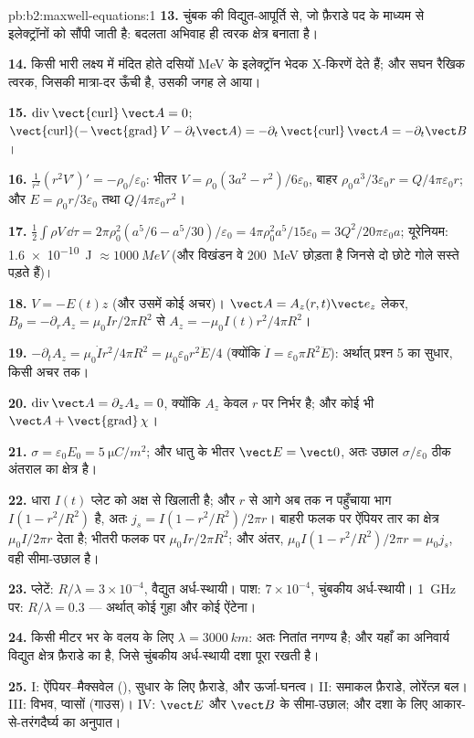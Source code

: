 \begin{solution}{pb:b2:maxwell-equations:1}
\textbf{13.} चुंबक की विद्युत-आपूर्ति से, जो फ़ैराडे पद के माध्यम से
इलेक्ट्रॉनों को सौंपी जाती है: बदलता अभिवाह ही त्वरक क्षेत्र बनाता है।

\textbf{14.} किसी भारी लक्ष्य में मंदित होते दसियों \unit{MeV} के इलेक्ट्रॉन
भेदक X-किरणें देते हैं; और सघन रैखिक त्वरक, जिसकी मात्रा-दर ऊँची है,
उसकी जगह ले आया।

\textbf{15.} $\operatorname{div}\operatorname{\vect{curl}}\vect A = 0$; $\operatorname{\vect{curl}}(-\operatorname{\vect{grad}}
V - \partial_t\vect A) = -\partial_t\operatorname{\vect{curl}}\vect A = -\partial_t\vect B$।

\textbf{16.} $\frac1{r^2}(r^2V')' = -\rho_0/\varepsilon_0$: भीतर $V = \rho_0(3a^2 - r^2)/6\varepsilon_0$,
बाहर $\rho_0a^3/3\varepsilon_0r = Q/4\pi\varepsilon_0r$; और $E = \rho_0r/3\varepsilon_0$ तथा
$Q/4\pi\varepsilon_0r^2$।

\textbf{17.} $\tfrac12\int\rho V\,\dd\tau = 2\pi\rho_0^2(a^5/6 - a^5/30)/\varepsilon_0 = 4\pi\rho_0^2a^5/
15\varepsilon_0 = 3Q^2/20\pi\varepsilon_0a$; यूरेनियम: \qty{1.6e-10}{J} $\approx \qty{1000}{MeV}$ (और विखंडन
वे \qty{200}{MeV} छोड़ता है जिनसे दो छोटे गोले सस्ते पड़ते हैं)।

\textbf{18.} $V = -E(t)z$ (और उसमें कोई अचर)। $\vect A = A_z(r, t)\vect e_z$ लेकर,
$B_\theta = -\partial_rA_z = \mu_0Ir/2\pi R^2$ से $A_z = -\mu_0I(t)r^2/4\pi R^2$।

\textbf{19.} $-\partial_tA_z = \mu_0\dot Ir^2/4\pi R^2 = \mu_0\varepsilon_0r^2\ddot E/4$ (क्योंकि $\dot I =
\varepsilon_0\pi R^2\ddot E$): अर्थात् प्रश्न 5 का सुधार, किसी अचर तक।

\textbf{20.} $\operatorname{div}\vect A = \partial_zA_z = 0$, क्योंकि $A_z$ केवल $r$ पर
निर्भर है; और कोई भी $\vect A + \operatorname{\vect{grad}}\chi$।

\textbf{21.} $\sigma = \varepsilon_0E_0 = \qty{5}{\micro C/m^2}$; और धातु के भीतर $\vect E =
\vect 0$, अतः उछाल $\sigma/\varepsilon_0$ ठीक अंतराल का क्षेत्र है।

\textbf{22.} धारा $I(t)$ प्लेट को अक्ष से खिलाती है; और $r$ से आगे
अब तक न पहुँचाया भाग $I(1 - r^2/R^2)$ है, अतः $j_s = I(1 -
r^2/R^2)/2\pi r$। बाहरी फलक पर ऐंपियर तार का क्षेत्र $\mu_0I/
2\pi r$ देता है; भीतरी फलक पर $\mu_0Ir/2\pi R^2$; और अंतर, $\mu_0I(1 -
r^2/R^2)/2\pi r = \mu_0j_s$, वही सीमा-उछाल है।

\textbf{23.} प्लेटें: $R/\lambda = 3 \times 10^{-4}$, वैद्युत अर्ध-स्थायी। पाश: $7 \times 10^{-4}$,
चुंबकीय अर्ध-स्थायी। \qty{1}{GHz} पर: $R/\lambda = 0.3$ --- अर्थात् कोई गुहा और कोई ऐंटेना।

\textbf{24.} किसी मीटर भर के वलय के लिए $\lambda = \qty{3000}{km}$: अतः  नितांत नगण्य है; और यहाँ का अनिवार्य विद्युत क्षेत्र
फ़ैराडे का है, जिसे चुंबकीय अर्ध-स्थायी दशा पूरा रखती है।

\textbf{25.} I: ऐंपियर--मैक्सवेल (), सुधार के लिए फ़ैराडे,
और ऊर्जा-घनत्व। II: समाकल फ़ैराडे, लोरेंत्ज़ बल।
III: विभव, प्वासों (गाउस)। IV: $\vect E$ और $\vect B$ के सीमा-उछाल;
और दशा के लिए आकार-से-तरंगदैर्घ्य का अनुपात।
\end{solution}
